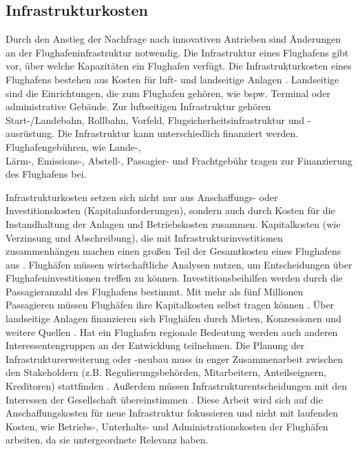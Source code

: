 \subsection{Infrastrukturkosten}
%
Durch den Anstieg der Nachfrage nach innovativen Antrieben sind Änderungen an der Flughafeninfrastruktur notwendig.
%
Die Infrastruktur eines Flughafens gibt vor, über welche Kapazitäten ein Flughafen verfügt.
Die Infrastrukturkosten eines Flughafens bestehen aus Kosten für luft- und landseitige Anlagen \cite{fur2003infrastrukturkosten}. 
Landseitige sind die Einrichtungen, die zum Flughafen gehören, wie bspw. Terminal oder administrative Gebäude. 
Zur luftseitigen Infrastruktur gehören Start-/Landebahn, Rollbahn, Vorfeld, Flugsicherheitsinfrastruktur und -ausrüstung. 
Die Infrastruktur kann unterschiedlich finanziert werden.
Flughafengebühren, wie Lande-, \\Lärm-, Emissions-, Abstell-, Passagier- und Frachtgebühr 
tragen zur Finanzierung des Flughafens bei.

Infrastrukturkosten setzen sich nicht nur aus Anschaffungs- oder Investitionskosten (Kapitalanforderungen), 
sondern auch durch Kosten für die Instandhaltung der Anlagen und Betriebskosten zusammen.
Kapitalkosten (wie Verzinsung und Abschreibung), die mit Infrastrukturinvestitionen zusammenhängen 
machen einen großen Teil der Gesamtkosten eines Flughafens aus \cite{wittmer2011aviation}.
%
Flughäfen müssen wirtschaftliche Analysen nutzen, um Entscheidungen über Flughafeninvestitionen treffen zu können. %
Investitionsbeihilfen werden durch die Passagieranzahl des Flughafens bestimmt. 
Mit mehr als fünf Millionen Passagieren müssen Flughäfen ihre Kapitalkosten selbst tragen können \cite{conrady2019luftverkehr}. 
%
Über landseitige Anlagen finanzieren sich Flughäfen durch Mieten, Konzessionen und weitere Quellen \cite{fur2003infrastrukturkosten}.
Hat ein Flughafen regionale Bedeutung werden auch anderen Interessentengruppen an der Entwicklung teilnehmen.
Die Planung der Infrastrukturerweiterung oder -neubau muss in enger Zusammenarbeit 
zwischen den Stakeholdern (z.B. Regulierungsbehörden, Mitarbeitern, Anteilseignern, Kreditoren) stattfinden \cite{wittmer2011aviation}.
%
Außerdem müssen Infrastrukturentscheidungen mit den Interessen der Gesellschaft übereinstimmen \cite{WissenschaftlicherBeirat2011}. 
%
Diese Arbeit wird sich auf die Anschaffungskosten für neue Infrastruktur fokussieren und nicht mit 
laufenden Kosten, wie Betriebs-, Unterhalts- und Administrationskosten der Flughäfen arbeiten, 
da sie untergeordnete Relevanz haben.
%
